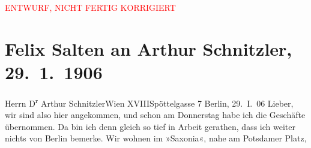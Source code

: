 
\begin{center}
            \textcolor{red}{ENTWURF, NICHT FERTIG KORRIGIERT}
                      \end{center}
            
         
         \renewcommand{\erwaehntePersonen}{Personen: Otto Brahm, Anna Katharina Rehmann, Ottilie Salten, Paul Salten, Olga Schnitzler, Heinrich Schnitzler}
         \renewcommand{\erwaehnteInstitutionen}{Institutionen: Theater des Westens}
         \renewcommand{\erwaehnteOrte}{Orte: Berlin, Charlottenburg, Edmund-Weiß-Gasse, Hotel Saxonia, Kantstraße, Potsdamer Platz, Wien, XVIII., Währing}
         \renewcommand{\erwaehnteWerke}{}
               \section[Felix Salten an Arthur Schnitzler, 29. 1. 1906]{ Felix Salten an Arthur Schnitzler, 29. 1. 1906}\nopagebreak{}\rehead{ }\begin{ledgroupsized}[t]{13cm}\normalsize\beginnumbering \toendnotes[C]{\smallbreak\pagebreak[2]} 
\toendnotes[C]{\smallbreak}\pstart{}{\pb}Herrn D\textsuperscript{r} Arthur Schnitzler\pend{}\pstart{}Wien XVIII\pend{}\pstart{}Spöttelgasse 7\pend{}{\bigskip}\pstart
           \raggedleft{}{\pb}Berlin,
                  29. I. 06\pend
           \pstart
           Lieber, wir sind also \label{K_L03413-1v}\label{K_L03413-1h} hier
               angekommen, und schon am Donnerstag habe ich die Geschäfte übernommen. Da bin ich
               denn gleich so tief in Arbeit gerathen, dass ich weiter nichts von Berlin bemerke. Wir wohnen im »Saxonia«, nahe am Potsdamer Platz,

\end{ledgroupsized}
